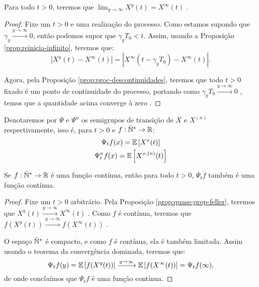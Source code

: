 \begin{proposicao}
  \label{prop:quase-prop-feller}
  Para todo $t > 0$, teremos que $\lim_{y \to \infty} X^y(t) =
  X^\infty(t)$  \qc.
\end{proposicao}
\begin{proof}
  Fixe um $t > 0$ e uma realização do processo. Como estamos supondo
  que $\gamma_y \xrightarrow{y\to\infty} 0$, então podemos supor que
  $\gamma_y T_0 < t$. Assim, usando a Proposição
  \ref{prop:reinicia-infinito}, teremos que:
  \begin{displaymath}
    |X^y(t) - X^\infty(t)| = |X^\infty(t-\gamma_yT_0) - X^\infty(t)|.
  \end{displaymath}

  Agora, pela Proposição \ref{prop:proc-descontinuidades}, teremos que
  todo $t > 0$ fixado é \qc um ponto de continuidade do processo,
  portando como $\gamma_y T_0 \xrightarrow{y \to \infty} 0$ \qc, temos
  que a quantidade acima converge à zero \qc. 
\end{proof}



\begin{definicao}
  \label{def:semigrupo}
  Denotaremos por $\Psi$ e $\Psi^n$ os semigrupos de transição de $X$
  e $X^{(n)}$ respectivamente, isso é, para $t > 0$ e $f: {\mathbb{\bar{N}^*}} \to
  {\mathbb{R}}$:
  \begin{gather*}
    \Psi_t f (x) = {\mathbb{E}} \left[ X^x(t) \right]\\
    \Psi^n_t f (x) = {\mathbb{E}} \left[ X^{x, (n)}(t) \right]
  \end{gather*}
\end{definicao}

\begin{proposicao}
  \label{prop:semigrupo-feller}
  Se $f: {\mathbb{\bar{N}^*}} \to {\mathbb{R}}$ é uma função contínua, então para todo $t > 0$,
  $\Psi_t f$ também é uma função contínua.
\end{proposicao}
\begin{proof}
  Fixe um $t > 0$ arbitrário. Pela Proposição
  \ref{prop:quase-prop-feller}, teremos que $X^y(t)
  \xrightarrow{y\to\infty} X^\infty(t)$ \qc. Como $f$ é contínua,
  teremos que $f(X^y(t)) \xrightarrow{y\to\infty} f(X^\infty(t))$ \qc.

  O espaço ${\mathbb{\bar{N}^*}}$ é compacto, e como $f$ é contínua, ela é também
  limitada. Assim usando o teorema da convergência dominada, teremos
  que:
  \begin{displaymath}
    \Psi_t f (y) = {\mathbb{E}} \left[ f(X^y(t)) \right]
    \xrightarrow{y\to\infty}
    {\mathbb{E}} \left[ f(X^\infty(t)) \right] = \Psi_t f (\infty),
  \end{displaymath}
  de onde concluímos que $\Psi_t f$ é uma função contínua.
\end{proof}

